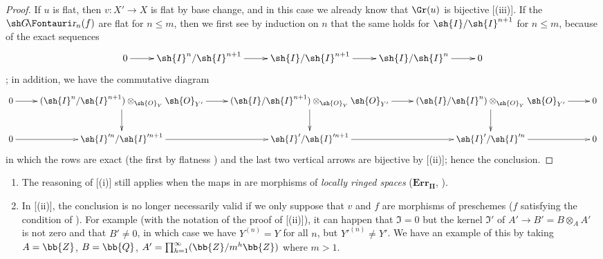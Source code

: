 \begin{proof}
If $u$ is flat, then $v:X'\to X$ is flat by base change, and in this case we already know that $\Gr(u)$ is bijective [(iii)].
If the $\shGr_n(f)$ are flat for $n\leq m$, then we first see by induction on $n$ that the same holds for $\sh{I}/\sh{I}^{n+1}$ for $n\leq m$, because of the exact sequences
  \[
    \xymatrix{
      0 \ar[r] & \sh{I}^n/\sh{I}^{n+1} \ar[r] & \sh{I}/\sh{I}^{n+1} \ar[r] & \sh{I}/\sh{I}^{n} \ar[r] & 0
    }
  \]
  ;
  in addition, we have the commutative diagram
  \[
    \xymatrix{
      0 \ar[r] & (\sh{I}^n/\sh{I}^{n+1}) \otimes_{\sh{O}_Y}\sh{O}_{Y'} \ar[d]\ar[r] &( \sh{I}/\sh{I}^{n+1}) \otimes_{\sh{O}_Y}\sh{O}_{Y'} \ar[d]\ar[r] & (\sh{I}/\sh{I}^{n}) \otimes_{\sh{O}_Y}\sh{O}_{Y'} \ar[d]\ar[r] & 0 \\
      0 \ar[r] & \sh{I}'^n/\sh{I}'^{n+1} \ar[r] & \sh{I}'/\sh{I}'^{n+1} \ar[r] & \sh{I}'/\sh{I}'^{n} \ar[r] & 0
    }
  \]
  in which the rows are exact (the first by flatness ) and the last two vertical arrows are bijective by [(ii)];
  hence the conclusion.
\end{proof}

\begin{remarks}[16.2.5]
\label{IV.16.2.5}
\medskip\noindent
\begin{enumerate}
  \item[(i)] The reasoning of [(i)] still applies when the maps in  are morphisms of \emph{locally ringed spaces} ($\mathbf{Err_{II}}$, ).
  \item[(ii)] In [(ii)], the conclusion is no longer necessarily valid if we only suppose that $v$ and $f$ are morphisms of preschemes ($f$ satisfying the condition of ).
  For example (with the notation of the proof of [(ii)]), it can happen that $\mathfrak{I} = 0$ but the kernel $\mathfrak{I}'$ of $A' \to B' = B \otimes_A A'$ is not zero and that $B' \neq 0$, in which case we have $Y^{(n)} = Y$ for all $n$, but ${Y'}^{(n)} \neq Y'$.
  We have an example of this by taking $A = \bb{Z}$, $B = \bb{Q}$, $A' = \prod_{h = 1}^\infty (\bb{Z}/m^h\bb{Z})$ where $m>1$.
\end{enumerate}
\end{remarks}

